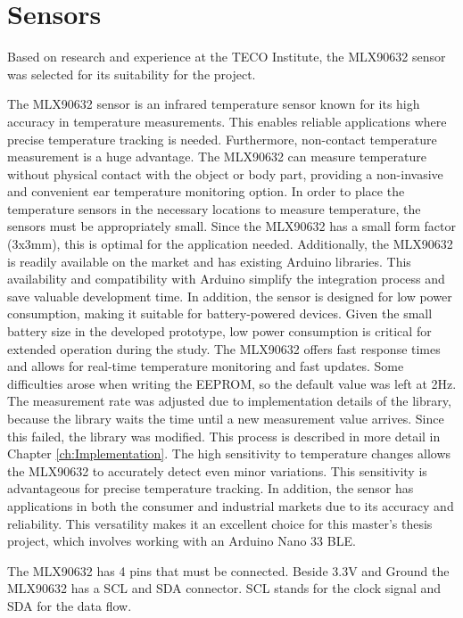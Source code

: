 
\section{Sensors}
\label{ch:Design:Prototype:Sensors}

Based on research and experience at the TECO Institute, the MLX90632 sensor was selected for its suitability for the project.

The MLX90632 sensor is an infrared temperature sensor known for its high accuracy in temperature measurements. This enables reliable applications where precise temperature tracking is needed.
Furthermore, non-contact temperature measurement is a huge advantage. 
The MLX90632 can measure temperature without physical contact with the object or body part, providing a non-invasive and convenient ear temperature monitoring option.
In order to place the temperature sensors in the necessary locations to measure temperature, the sensors must be appropriately small. 
Since the MLX90632 has a small form factor (3x3mm), this is optimal for the application needed.
Additionally, the MLX90632 is readily available on the market and has existing Arduino libraries. 
This availability and compatibility with Arduino simplify the integration process and save valuable development time.
In addition, the sensor is designed for low power consumption, making it suitable for battery-powered devices. 
Given the small battery size in the developed prototype, low power consumption is critical for extended operation during the study.
The MLX90632 offers fast response times and allows for real-time temperature monitoring and fast updates. 
Some difficulties arose when writing the EEPROM, so the default value was left at 2Hz.
The measurement rate was adjusted due to implementation details of the library, because the library waits the time until a new measurement value arrives.
Since this failed, the library was modified.
This process is described in more detail in Chapter \ref{ch:Implementation}.
The high sensitivity to temperature changes allows the MLX90632 to accurately detect even minor variations. 
This sensitivity is advantageous for precise temperature tracking.
In addition, the sensor has applications in both the consumer and industrial markets due to its accuracy and reliability. 
This versatility makes it an excellent choice for this master's thesis project, which involves working with an Arduino Nano 33 BLE.

The MLX90632 has 4 pins that must be connected. 
Beside 3.3V and Ground the MLX90632 has a SCL and SDA connector. 
SCL stands for the clock signal and SDA for the data flow.

